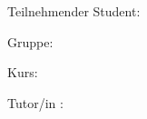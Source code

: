 
\begin{titlepage}

\vspace{20mm}
\begin{center}
\scalebox{1.6}{
    \textbf{\Large \versuch } 
    } \par
    \vspace{20mm}
    \par
    \vspace{10mm}
    \scalebox{1.2}{
    \datum} \par
    \vspace{100mm}


    

\vspace{50mm}
    Teilnehmender Student: \textbf{\name} \par
    Gruppe: \gruppe \par
    Kurs: \Kurs \par
    Tutor/in : \tutor \par
\end{center}
\end{titlepage}